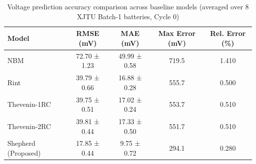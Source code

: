 \begin{table}[htbp]
\centering
\caption{Voltage prediction accuracy comparison across baseline models (averaged over 8 XJTU Batch-1 batteries, Cycle 0)}
\label{tab:baseline_comparison}
\begin{tabular}{lcccc}
\hline
Model & RMSE (mV) & MAE (mV) & Max Error (mV) & Rel. Error (\%) \\
\hline
NBM & 72.70 ± 1.23 & 49.99 ± 0.58 & 719.5 & 1.410 \\
Rint & 39.79 ± 0.66 & 16.88 ± 0.28 & 555.7 & 0.500 \\
Thevenin-1RC & 39.75 ± 0.51 & 17.02 ± 0.24 & 553.7 & 0.510 \\
Thevenin-2RC & 39.81 ± 0.44 & 17.33 ± 0.50 & 551.7 & 0.510 \\
Shepherd (Proposed) & 17.85 ± 0.44 & 9.75 ± 0.72 & 294.1 & 0.280 \\
\hline
\end{tabular}
\end{table}
